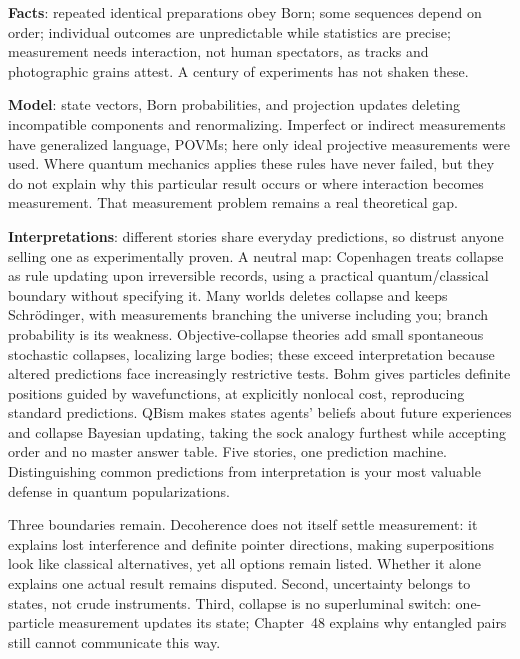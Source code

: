 \textbf{Facts}: repeated identical preparations obey Born; some sequences depend on order; individual outcomes are unpredictable while statistics are precise; measurement needs interaction, not human spectators, as tracks and photographic grains attest. A century of experiments has not shaken these.

\textbf{Model}: state vectors, Born probabilities, and projection updates deleting incompatible components and renormalizing. Imperfect or indirect measurements have generalized language, POVMs; here only ideal projective measurements were used. Where quantum mechanics applies these rules have never failed, but they do not explain why this particular result occurs or where interaction becomes measurement. That measurement problem remains a real theoretical gap.

\textbf{Interpretations}: different stories share everyday predictions, so distrust anyone selling one as experimentally proven. A neutral map: Copenhagen treats collapse as rule updating upon irreversible records, using a practical quantum/classical boundary without specifying it. Many worlds deletes collapse and keeps Schrödinger, with measurements branching the universe including you; branch probability is its weakness. Objective-collapse theories add small spontaneous stochastic collapses, localizing large bodies; these exceed interpretation because altered predictions face increasingly restrictive tests. Bohm gives particles definite positions guided by wavefunctions, at explicitly nonlocal cost, reproducing standard predictions. QBism makes states agents' beliefs about future experiences and collapse Bayesian updating, taking the sock analogy furthest while accepting order and no master answer table. Five stories, one prediction machine. Distinguishing common predictions from interpretation is your most valuable defense in quantum popularizations.

Three boundaries remain. Decoherence does not itself settle measurement: it explains lost interference and definite pointer directions, making superpositions look like classical alternatives, yet all options remain listed. Whether it alone explains one actual result remains disputed. Second, uncertainty belongs to states, not crude instruments. Third, collapse is no superluminal switch: one-particle measurement updates its state; Chapter~48 explains why entangled pairs still cannot communicate this way.

